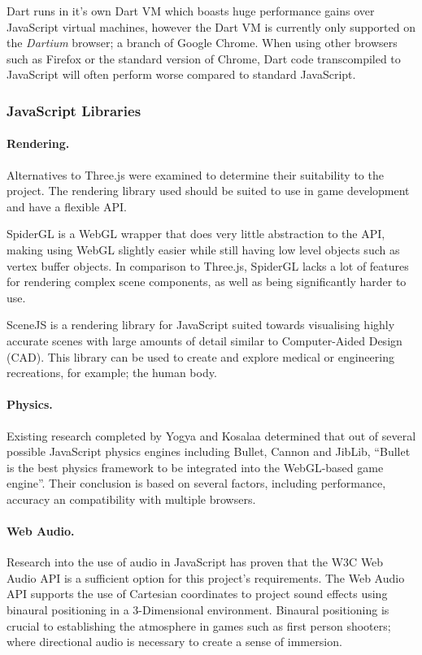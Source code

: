 \documentclass[a4paper, 12pt]{article}
\begin{document}
Dart runs in it's own Dart VM which boasts huge performance gains over JavaScript virtual machines, however the Dart VM is currently only supported on the \emph{Dartium} browser; a branch of Google Chrome. When using other browsers such as Firefox or the standard version of Chrome, Dart code transcompiled to JavaScript will often perform worse compared to standard JavaScript.\cite{dartperformance}

\subsubsection{JavaScript Libraries}

\paragraph{Rendering.}
Alternatives to Three.js were examined to determine their suitability to the project. The rendering library used should be suited to use in game development and have a flexible API.

SpiderGL is a WebGL wrapper that does very little abstraction to the API, making using WebGL slightly easier while still having low level objects such as vertex buffer objects.\cite{spidergl} In comparison to Three.js, SpiderGL lacks a lot of features for rendering complex scene components, as well as being significantly harder to use.

SceneJS is a rendering library for JavaScript suited towards visualising highly accurate scenes with large amounts of detail similar to Computer-Aided Design (CAD). This library can be used to create and explore medical or engineering recreations, for example; the human body.\cite{scenejs}

\paragraph{Physics.}
Existing research completed by Yogya and Kosalaa determined that out of several possible JavaScript physics engines including Bullet, Cannon and JibLib, ``Bullet is the best physics framework to be integrated into the WebGL-based game engine''.\cite{yogya2014comparison} Their conclusion is based on several factors, including performance, accuracy an compatibility with multiple browsers. 

\paragraph{Web Audio.}
Research into the use of audio in JavaScript has proven that the W3C Web Audio API is a sufficient option for this project's requirements. The Web Audio API supports the use of Cartesian coordinates to project sound effects using binaural positioning in a 3-Dimensional environment.\cite{webaudio} Binaural positioning is crucial to establishing the atmosphere in games such as first person shooters; where directional audio is necessary to create a sense of immersion.
\end{document}
